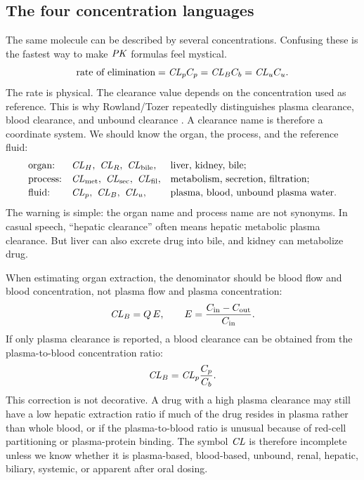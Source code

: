 \documentclass[a4paper]{article}
\newcommand{\CL}{\ensuremath{\pksym{CL}}}
\newcommand{\CLR}{\ensuremath{\pksym{CL}_{R}}}
\newcommand{\CLH}{\ensuremath{\pksym{CL}_{H}}}
\newcommand{\CLB}{\ensuremath{\pksym{CL}_{B}}}
\newcommand{\CLp}{\ensuremath{\pksym{CL}_{p}}}
\newcommand{\CLu}{\ensuremath{\pksym{CL}_{u}}}
\newcommand{\CLbile}{\ensuremath{\pksym{CL}_{\pklab{bile}}}}
\newcommand{\Fa}{\ensuremath{\pksym{F}_a}}
\newcommand{\Fg}{\ensuremath{\pksym{F}_G}}
\newcommand{\Fh}{\ensuremath{\pksym{F}_H}}
\newcommand{\Fbio}{\ensuremath{F}}
\newcommand{\Cin}{\ensuremath{C_{\pklab{in}}}}
\newcommand{\Cout}{\ensuremath{C_{\pklab{out}}}}
\newcommand{\PK}{\ensuremath{\pksym{PK}}}
\begin{document}
\begin{center}
{
}
\end{center}

\subsection{The four concentration languages}

The same molecule can be described by several concentrations. Confusing these is the fastest way to make \PK{} formulas feel mystical.
\[
  \text{rate of elimination}
  =
  \CLp C_p
  =
  \CLB C_b
  =
  \CLu C_u.
\]
The rate is physical. The clearance value depends on the concentration used as reference. This is why Rowland/Tozer repeatedly distinguishes plasma clearance, blood clearance, and unbound clearance \cite{rowlandTozer2019ClinicalPKPD}. A clearance name is therefore a coordinate system. We should know the organ, the process, and the reference fluid:
\[
\begin{array}{lll}
  \text{organ:} & \CLH,\ \CLR,\ \CLbile, & \text{liver, kidney, bile;}\\[2pt]
  \text{process:} & \CL_{\pklab{met}},\ \CL_{\pklab{sec}},\ \CL_{\pklab{fil}}, & \text{metabolism, secretion, filtration;}\\[2pt]
  \text{fluid:} & \CLp,\ \CLB,\ \CLu, & \text{plasma, blood, unbound plasma water.}
\end{array}
\]
The warning is simple: the organ name and process name are not synonyms. In casual speech, ``hepatic clearance'' often means hepatic metabolic plasma clearance. But liver can also excrete drug into bile, and kidney can metabolize drug.

When estimating organ extraction, the denominator should be blood flow and blood concentration, not plasma flow and plasma concentration:
\[
  \CLB = Q\,E,
  \qquad
  E=\frac{\Cin-\Cout}{\Cin}.
\]
If only plasma clearance is reported, a blood clearance can be obtained from the plasma-to-blood concentration ratio:
\[
  \CLB = \CLp\frac{C_p}{C_b}.
\]
This correction is not decorative. A drug with a high plasma clearance may still have a low hepatic extraction ratio if much of the drug resides in plasma rather than whole blood, or if the plasma-to-blood ratio is unusual because of red-cell partitioning or plasma-protein binding. The symbol \(\CL\) is therefore incomplete unless we know whether it is plasma-based, blood-based, unbound, renal, hepatic, biliary, systemic, or apparent after oral dosing.
\end{document}
